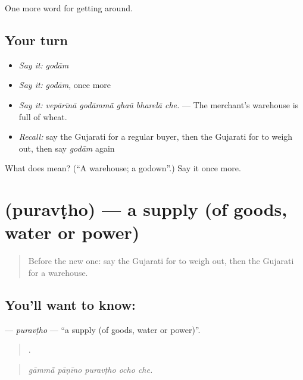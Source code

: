 \begin{grammarlens}[title={What you've built}]
One more word for getting around.
\end{grammarlens}

\subsection*{Your turn}
\begin{itemize}
\raggedright
  \item \emph{Say it:} \emph{godām}
  \item \emph{Say it:} \emph{godām}, once more
  \item \emph{Say it:} \emph{vepārīnā godāmmā̃ ghaũ bharelā che.} — The merchant's warehouse is full of wheat.
  \item \emph{Recall:} say the Gujarati for a regular buyer, then the Gujarati for to weigh out, then say \emph{godām} again
\end{itemize}

\begin{tcolorbox}[breakable,colback=teal!4,colframe=teal!35!black,title={Before you move on}]
What does  mean? (\textquotedblleft{}A warehouse; a godown\textquotedblright{}.) Say it once more.
\end{tcolorbox}
\section[\texorpdfstring{\gu{પુરવઠો} (puravṭho)}{પુરવઠો (puravṭho)}]{ (puravṭho) — a supply (of goods, water or power)}

\label{lesson:GU-C431-puravtho}



\begin{quote}
Before the new one: say the Gujarati for to weigh out, then the Gujarati for a warehouse.
\end{quote}

\subsection*{You'll want to know: }
\textbf{} — \emph{puravṭho} — \textquotedblleft{}a supply (of goods, water or power)\textquotedblright{}.

\begin{quote}
    .
\end{quote}

\begin{quote}
\emph{gāmmā̃ pāṇīno puravṭho ocho che.}
\end{quote}


